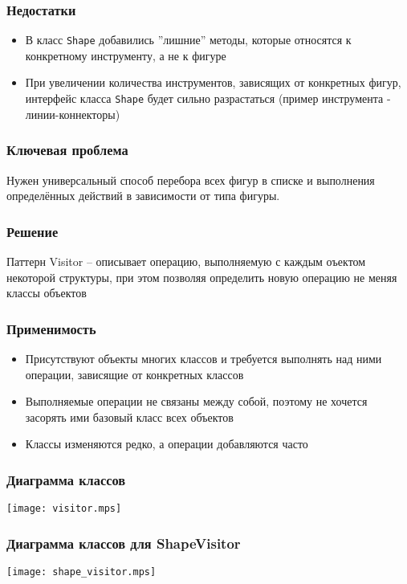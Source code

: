 \documentclass[handout]{beamer}
\begin{document}
\begin{frame}[fragile]
\frametitle{Недостатки}
\begin{itemize}
\item В класс \lstinline{Shape} добавились ''лишние'' методы, которые относятся к конкретному
      инструменту, а не к фигуре
\item При увеличении количества инструментов, зависящих от конкретных фигур, интерфейс
      класса \lstinline{Shape} будет сильно разрастаться (пример инструмента - линии-коннекторы)
\end{itemize}
\end{frame}


\begin{frame}[fragile]
\frametitle{Ключевая проблема}
Нужен универсальный способ перебора всех фигур в списке и выполнения определённых действий
в зависимости от типа фигуры.
\end{frame}


\begin{frame}[fragile]
\frametitle{Решение}
Паттерн Visitor -- описывает операцию, выполняемую с каждым оъектом некоторой структуры,
при этом позволяя определить новую операцию не меняя классы объектов
\end{frame}


\begin{frame}[fragile]
\frametitle{Применимость}
\begin{itemize}
\item Присутствуют объекты многих классов и требуется выполнять над ними операции, 
      зависящие от конкретных классов
\item Выполняемые операции не связаны между собой, поэтому не хочется засорять
      ими базовый класс всех объектов
\item Классы изменяются редко, а операции добавляются часто
\end{itemize}
\end{frame}


\begin{frame}[fragile]
\frametitle{Диаграмма классов}
\begin{center}
\texttt{[image: visitor.mps]}
\end{center}
\end{frame}


\begin{frame}[fragile]
\frametitle{Диаграмма классов для ShapeVisitor}
\begin{center}
\texttt{[image: shape\_visitor.mps]}
\end{center}
\end{frame}
\end{document}
